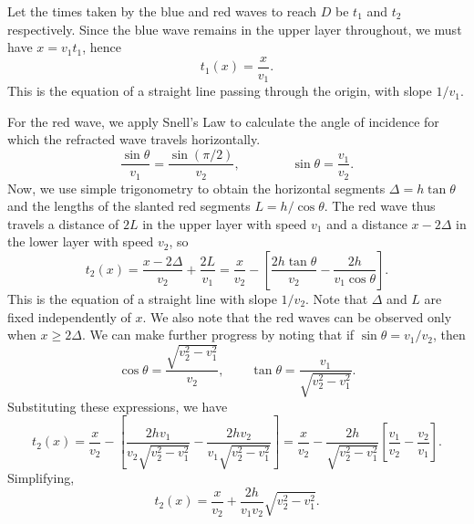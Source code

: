 \documentclass[10pt]{article}
\begin{document}
    Let the times taken by the blue and red waves to reach $D$ be $t_1$ and $t_2$
    respectively. Since the blue wave remains in the upper layer throughout, we must
    have $x = v_1t_1$, hence \[
        \boxed{t_1(x) = \frac{x}{v_1}.} 
    \]
    This is the equation of a straight line passing through the origin, with slope
    $1 /v_1$.

    For the red wave, we apply Snell's Law to calculate the angle of incidence for
    which the refracted wave travels horizontally. \[
        \frac{\sin\theta}{v_1} = \frac{\sin(\pi /2)}{v_2}, \qquad
        \qquad \sin\theta = \frac{v_1}{v_2}.
    \] 
    Now, we use simple trigonometry to obtain the horizontal segments $\Delta =
    h\tan\theta$ and the lengths of the slanted red segments $L = h / \cos\theta$.
    The red wave thus travels a distance of $2L$ in the upper layer with speed $v_1$
    and a distance $x - 2\Delta$ in the lower layer with speed $v_2$, so \[
        t_2(x) = \frac{x - 2\Delta}{v_2} + \frac{2L}{v_1} 
            = \frac{x}{v_2} - \left[\frac{2h\tan\theta}{v_2} -
                \frac{2h}{v_1\cos\theta}\right].
        \] 
    This is the equation of a straight line with slope $1 / v_2$.  Note that
    $\Delta$ and $L$ are fixed independently of $x$.  We also note that the red
    waves can be observed only when $x \geq 2\Delta$.  We can make further progress
    by noting that if $\sin\theta = v_1 / v_2$, then \[
        \cos\theta = \frac{\sqrt{v_2^2 - v_1^2}}{v_2}, \qquad
        \tan\theta = \frac{v_1}{\sqrt{v_2^2 - v_1^2}}.
    \] Substituting these expressions, we have \[
        t_2(x) = \frac{x}{v_2} - \left[\frac{2hv_1}{v_2\sqrt{v_2^2 - v_1^2}}
        - \frac{2hv_2}{v_1\sqrt{v_2^2 - v_1^2}}\right]
            = \frac{x}{v_2} - \frac{2h}{\sqrt{v_2^2 - v_1^2}}\left[
            \frac{v_1}{v_2} - \frac{v_2}{v_1}\right].
    \] Simplifying, \[
        \boxed{t_2(x) = \frac{x}{v_2} + \frac{2h}{v_1v_2}\sqrt{v_2^2 -
        v_1^2}.}
    \] 
\end{document}
